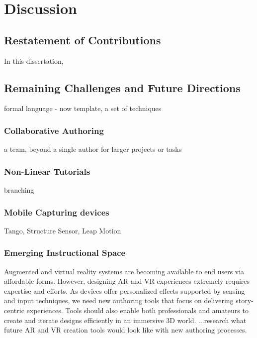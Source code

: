 \chapter{Discussion}
\label{chapter_conclusion}

\section{Restatement of Contributions}
In this dissertation,


\section{Remaining Challenges and Future Directions}

formal language
- now template, a set of techniques

\subsection{Collaborative Authoring}
a team, beyond a single author for larger projects or tasks

\subsection{Non-Linear Tutorials}
branching

\subsection{Mobile Capturing devices}
Tango, Structure Sensor, Leap Motion

\subsection{Emerging Instructional Space}

Augmented and virtual reality systems are becoming available to end users via affordable forms. However, designing AR and VR experiences extremely requires expertise and efforts. As devices offer personalized effects supported by sensing and input techniques, we need new authoring tools that focus on delivering story-centric experiences. Tools should also enable both professionals and amateurs to create and iterate designs efficiently in an immersive 3D world. ...research what future AR and VR creation tools would look like with new authoring processes.

